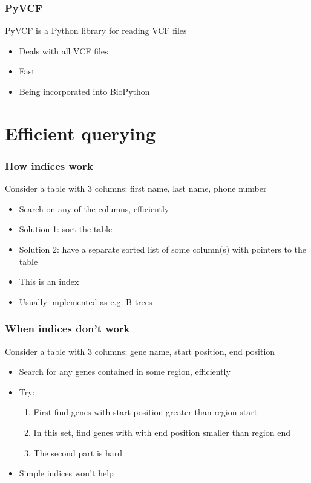 \documentclass[slidestop]{beamer}
\begin{document}
\begin{frame}
  \frametitle{PyVCF}
  PyVCF is a Python library for reading VCF files
  \begin{itemize}
    \item Deals with all VCF files
    \item Fast
    \item Being incorporated into BioPython
  \end{itemize}
\end{frame}

\section{Efficient querying}

\begin{frame}
  \frametitle{How indices work}
  Consider a table with 3 columns: first name, last name, phone number
  \begin{itemize}
    \item Search on any of the columns, efficiently
    \item Solution 1: sort the table
    \item Solution 2: have a separate sorted list of some column(s) with pointers to the table
    \item This is an index
    \item Usually implemented as e.g. B-trees
  \end{itemize}
\end{frame}

\begin{frame}
  \frametitle{When indices don't work}
  Consider a table with 3 columns: gene name, start position, end position
  \begin{itemize}
    \item Search for any genes contained in some region, efficiently
    \item Try:
      \begin{enumerate}
        \item First find genes with start position greater than region start
        \item In this set, find genes with with end position smaller than region end
        \item The second part is hard
      \end{enumerate}
    \item Simple indices won't help
  \end{itemize}
\end{frame}
\end{document}
